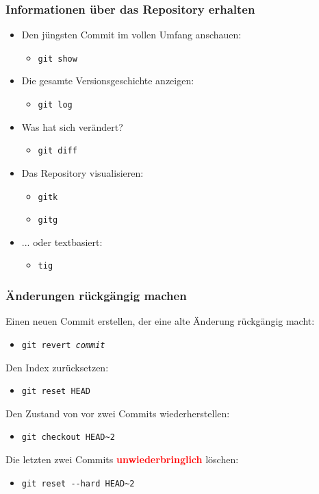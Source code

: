 \documentclass{beamer}
\begin{document}
\begin{frame}
\frametitle{Informationen über das Repository erhalten}



\begin{itemize}

	\item[] Den jüngsten Commit im vollen Umfang anschauen:
	\begin{itemize}
		\item \texttt{git show}
	\end{itemize}

	\item[] Die gesamte Versionsgeschichte anzeigen:
	\begin{itemize}
		\item \texttt{git log}
	\end{itemize}

	\item[]  Was hat sich verändert?
	\begin{itemize}
		\item \texttt{git diff}
	\end{itemize}

	\item[] Das Repository visualisieren:
	\begin{itemize}
		\item \texttt{gitk}
		\item \texttt{gitg}
	\end{itemize}

	\item[] ... oder textbasiert:
	\begin{itemize}
		\item \texttt{tig}
	\end{itemize}

\end{itemize}


\end{frame}
\begin{frame}
\frametitle{Änderungen rückgängig machen}



Einen neuen Commit erstellen, der eine alte Änderung rückgängig macht:
\begin{itemize}
	\item \texttt{git revert \emph{commit}}
\end{itemize}

Den Index zurücksetzen:
\begin{itemize}
	\item \texttt{git reset HEAD}
\end{itemize}

Den Zustand von vor zwei Commits wiederherstellen:
\begin{itemize}
	\item \texttt{git checkout HEAD\textasciitilde{}2}
\end{itemize}

Die letzten zwei Commits \textcolor{red}{\textbf{unwiederbringlich}} löschen:
\begin{itemize}
	\item \texttt{git reset -{}-hard HEAD\textasciitilde{}2}
\end{itemize}


\end{frame}
\end{document}
